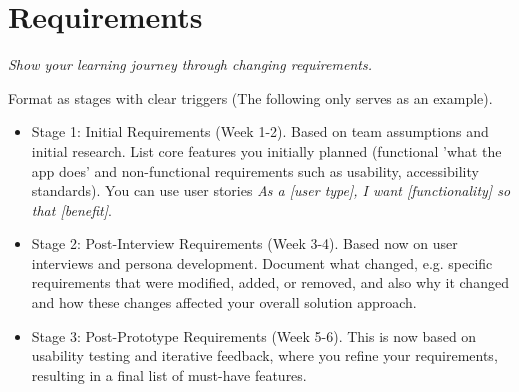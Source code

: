 \section{Requirements}
\emph{Show your learning journey through changing requirements.}

Format as stages with clear triggers (The following only serves as an example).
\begin{itemize}
    \item Stage 1: Initial Requirements (Week 1-2). Based on team assumptions and initial research. List core features you initially planned (functional 'what the app does' and non-functional requirements such as usability, accessibility standards). You can use user stories \emph{As a [user type], I want [functionality] so that [benefit]}. 
    \item Stage 2: Post-Interview Requirements (Week 3-4). Based now on user interviews and persona development. Document what changed, e.g. specific requirements that were modified, added, or removed, and also why it changed and how these changes affected your overall solution approach.
    \item Stage 3: Post-Prototype Requirements (Week 5-6). This is now based on usability testing and iterative feedback, where you refine your requirements, resulting in a final list of must-have features.
\end{itemize}
